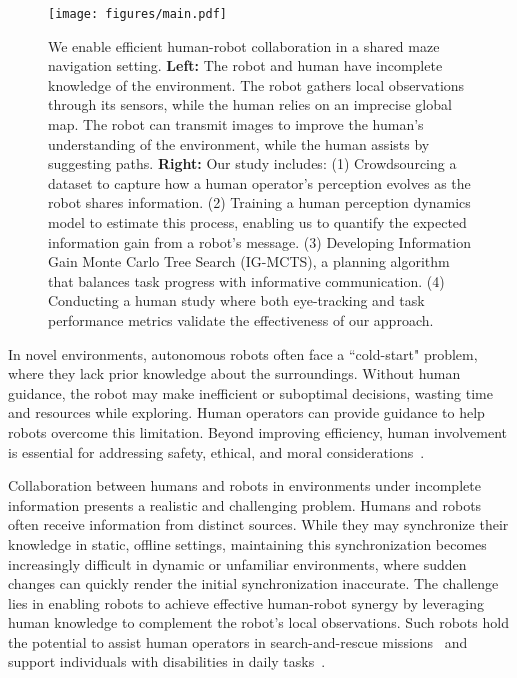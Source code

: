 \begin{figure*}[t]
    \centering
    \vskip -0.05in
    \texttt{[image: figures/main.pdf]}
    \vskip -0.1in
    \caption{We enable efficient human-robot collaboration in a shared maze navigation setting. \textbf{Left:} The robot and human have incomplete knowledge of the environment. The robot gathers local observations through its sensors, while the human relies on an imprecise global map. The robot can transmit images to improve the human’s understanding of the environment, while the human assists by suggesting paths. \textbf{Right:} Our study includes: (1) Crowdsourcing a dataset to capture how a human operator’s perception evolves as the robot shares information. (2) Training a human perception dynamics model to estimate this process, enabling us to quantify the expected information gain from a robot's message. (3) Developing Information Gain Monte Carlo Tree Search (IG-MCTS), a planning algorithm that balances task progress with informative communication. (4) Conducting a human study where both eye-tracking and task performance metrics validate the effectiveness of our approach.}
    \label{fig:overview_figure}
    \vskip -0.1in
\end{figure*}

In novel environments, autonomous robots often face a ``cold-start" problem, where they lack prior knowledge about the surroundings. Without human guidance, the robot may make inefficient or suboptimal decisions, wasting time and resources while exploring. Human operators can provide guidance to help robots overcome this limitation. Beyond improving efficiency, human involvement is essential for addressing safety, ethical, and moral considerations~\cite{sterz2024quest,van2020allocation,van2021moral}.

Collaboration between humans and robots in environments under incomplete information presents a realistic and challenging problem.
Humans and robots often receive information from distinct sources. While they may synchronize their knowledge in static, offline settings, maintaining this synchronization becomes increasingly difficult in dynamic or unfamiliar environments, where sudden changes can quickly render the initial synchronization inaccurate.
The challenge lies in enabling robots to achieve effective human-robot synergy by leveraging human knowledge to complement the robot’s local observations.
Such robots hold the potential to assist human operators in search-and-rescue missions~\cite{doroodgar2010search,nourbakhsh2005human} and support individuals with disabilities in daily tasks~\cite{jain2019probabilistic,gopinath2016human}.


